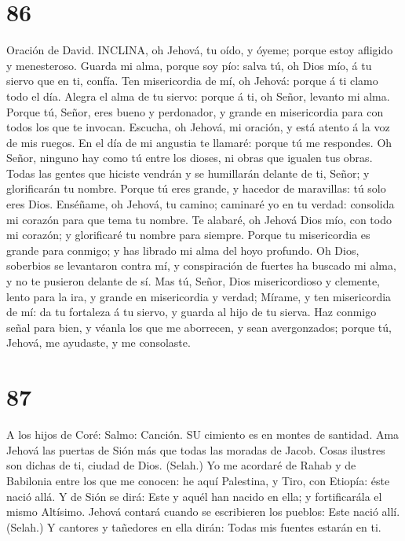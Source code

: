 \hypertarget{section-85}{%
\section{86}\label{section-85}}

 Oración de David. INCLINA, oh Jehová, tu oído, y óyeme;
porque estoy afligido y menesteroso.  Guarda mi alma, porque
soy pío: salva tú, oh Dios mío, á tu siervo que en ti, confía.
 Ten misericordia de mí, oh Jehová: porque á ti clamo todo
el día.  Alegra el alma de tu siervo: porque á ti, oh Señor,
levanto mi alma.  Porque tú, Señor, eres bueno y perdonador,
y grande en misericordia para con todos los que te invocan. 
Escucha, oh Jehová, mi oración, y está atento á la voz de mis ruegos.
 En el día de mi angustia te llamaré: porque tú me
respondes.  Oh Señor, ninguno hay como tú entre los dioses,
ni obras que igualen tus obras.  Todas las gentes que
hiciste vendrán y se humillarán delante de ti, Señor; y glorificarán tu
nombre.  Porque tú eres grande, y hacedor de maravillas: tú
solo eres Dios.  Enséñame, oh Jehová, tu camino; caminaré
yo en tu verdad: consolida mi corazón para que tema tu nombre.
 Te alabaré, oh Jehová Dios mío, con todo mi corazón; y
glorificaré tu nombre para siempre.  Porque tu misericordia
es grande para conmigo; y has librado mi alma del hoyo profundo.
 Oh Dios, soberbios se levantaron contra mí, y conspiración
de fuertes ha buscado mi alma, y no te pusieron delante de sí.
 Mas tú, Señor, Dios misericordioso y clemente, lento para
la ira, y grande en misericordia y verdad;  Mírame, y ten
misericordia de mí: da tu fortaleza á tu siervo, y guarda al hijo de tu
sierva.  Haz conmigo señal para bien, y véanla los que me
aborrecen, y sean avergonzados; porque tú, Jehová, me ayudaste, y me
consolaste.

\hypertarget{section-86}{%
\section{87}\label{section-86}}

 A los hijos de Coré: Salmo: Canción. SU cimiento es en
montes de santidad.  Ama Jehová las puertas de Sión más que
todas las moradas de Jacob.  Cosas ilustres son dichas de
ti, ciudad de Dios. (Selah.)  Yo me acordaré de Rahab y de
Babilonia entre los que me conocen: he aquí Palestina, y Tiro, con
Etiopía: éste nació allá.  Y de Sión se dirá: Este y aquél
han nacido en ella; y fortificarála el mismo Altísimo. 
Jehová contará cuando se escribieren los pueblos: Este nació allí.
(Selah.)  Y cantores y tañedores en ella dirán: Todas mis
fuentes estarán en ti.

